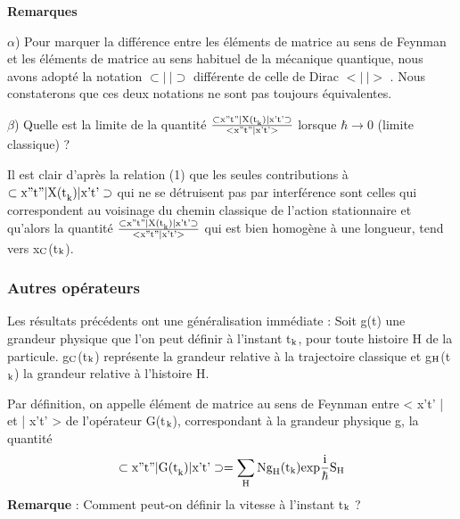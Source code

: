 {\bf Remarques}

$\alpha$) Pour marquer la différence entre les éléments de matrice au sens de
Feynman et les éléments de matrice au sens habituel de la mécanique
quantique, nous avons adopté la notation $\subset |\ | \supset$ différente de celle de
Dirac $< |\ | >$ . Nous constaterons que ces deux notations ne sont pas
toujours équivalentes.

$\beta$) Quelle est la limite de la quantité
$\frac{\subset \text{x''t''} | \text{X(t}_{\text{k}}) | \text{x't'}\supset}{\text{<x''t''|x't'>}}$
lorsque  $\hbar \to 0$ (limite classique) ?

Il est clair d'après la relation (1) que les seules contributions à
$\subset \text{x''t''} | \text{X(t}_{\text{k}}) | \text{x't'}\supset$
qui ne se détruisent pas par interférence
sont celles qui correspondent au voisinage du chemin classique de l'action
stationnaire et qu'alors la quantité
$\frac{\subset \text{x''t''} | \text{X(t}_{\text{k}}) | \text{x't'}\supset}{\text{<x''t''|x't'>}}$
qui est bien homogène à une longueur, tend vers x$_{\text{C}}$(t$_{\text{k}}$).

\subsubsection{Autres opérateurs} %
Les résultats précédents ont une généralisation immédiate :
Soit g(t) une grandeur physique que l'on peut définir à l'instant t$_{\text{k}}$, pour
toute histoire H de la particule.  g$_{\text{C}}$(t$_{\text{k}}$) représente la grandeur relative
à la trajectoire classique et g$_{\text{H}}$(t$_{\text{k}}$) la grandeur relative à l'histoire H.

Par définition, on appelle élément de matrice au sens de
Feynman entre < x't' | et | x't' > de l'opérateur G(t$_{\text{k}}$), correspondant à
la grandeur physique g, la quantité
\[
\subset \text{x''t''} | \text{G(t}_{\text{k}}) | \text{x't'}\supset =
\sum_{\text{H}}\text{N} \text{g}_{\text{H}} (\text{t}_{\text{k}}) \text{exp} \frac{\text{i}}{\hbar} \text{S}_{\text{H}}
\]
{\bf Remarque} : Comment peut-on définir la vitesse à l'instant t$_{\text{k}}$ ?

\begin{center}  \end{center}

